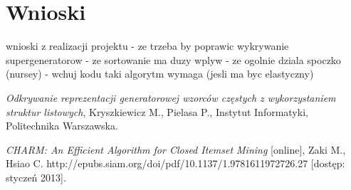 \documentclass[a4paper,10pt]{article}
\begin{document}
\section{Wnioski}
wnioski z realizacji projektu
- ze trzeba by poprawic wykrywanie supergeneratorow
- ze sortowanie ma duzy wplyw
- ze ogolnie dziala spoczko (nursey)
- wchuj kodu taki algorytm wymaga (jesli ma byc elastyczny)



\begin{thebibliography}{*}

  \emph{Odkrywanie reprezentacji generatorowej wzorców częstych z wykorzystaniem struktur listowych},
  Kryszkiewicz M., Pielasa P.,
  Instytut Informatyki,
  Politechnika Warszawska.

  \emph{CHARM: An Efficient Algorithm for Closed Itemset Mining} [online],
  Zaki M., Hsiao C.
  http://epubs.siam.org/doi/pdf/10.1137/1.9781611972726.27 [dostęp: styczeń 2013].

\end{thebibliography}
\end{document}

